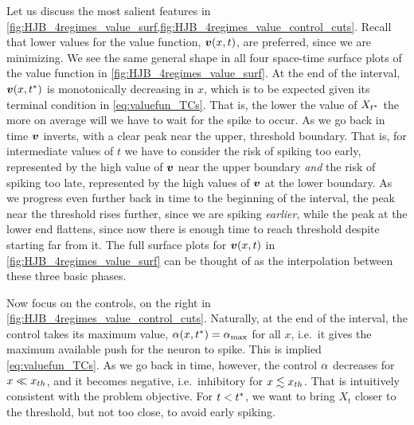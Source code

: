 \documentclass[12pt]{iopart}
\begin{document}
Let us discuss the most salient features in
\cref{fig:HJB_4regimes_value_surf,fig:HJB_4regimes_value_control_cuts}. Recall
that lower values for the value function, ${ \boldsymbol{v} }(x,t)$, are preferred, since we are
minimizing. We see the same general shape in all four space-time surface plots
of the value function in \cref{fig:HJB_4regimes_value_surf}. At the end of the
interval, ${ \boldsymbol{v} }(x,{ t^* })$ is monotonically decreasing in $x$, which is to be expected
given its terminal condition in \cref{eq:valuefun_TCs}. That is, the lower the
value of $X_{ t^* }$ the more on average will we have to wait for the spike to occur.
As we go back in time ${ \boldsymbol{v} }$ inverts, with a clear peak near the upper, threshold
boundary. That is, for intermediate values of $t$ we have to consider the risk
of spiking too early, represented by the high value of ${ \boldsymbol{v} }$ near the upper
boundary {\sl and} the risk of spiking too late, represented by the high values
of ${ \boldsymbol{v} }$ at the lower boundary. As we progress even further back in time to the
beginning of the interval, the peak near the threshold rises further, since we are spiking
{\sl earlier}, while the peak at the lower end flattens, since now there is
enough time to reach threshold despite starting far from it. The full surface
plots for ${ \boldsymbol{v} }(x,t)$ in \cref{fig:HJB_4regimes_value_surf} can be thought of as
the interpolation between these three basic phases.

Now focus on the controls, on the right in
\cref{fig:HJB_4regimes_value_control_cuts}. Naturally, at the end of the
interval, the control takes its maximum value, ${\alpha}(x,{ t^* }) = { {\alpha}_{\textrm{max}} }$ for all $x$,
i.e.\ it gives the maximum available push for the neuron to spike. This is
implied \cref{eq:valuefun_TCs}. As we go back in time, however, the control ${\alpha}$
decreases for $x \ll { x_{th} }$, and it becomes negative, i.e.\ inhibitory for $x
\lesssim { x_{th} }$. That is intuitively consistent with the problem objective. 
For $t<{ t^* }$, we want to bring $X_t$ closer to the threshold, but not too close, to
avoid early spiking.
\end{document}
